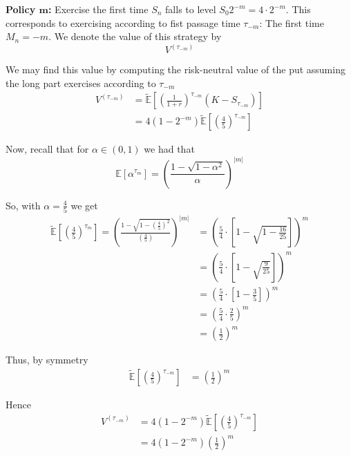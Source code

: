 \documentclass[12pt]{article}
\newlength\tindent
\renewcommand{\indent}{\hspace*{\tindent}}
\newcommand{\E}{\mathbb E}
\begin{document}
\begin{adjustwidth}{1cm}{} {\bf Policy $\bm m$:} Exercise the first time $S_n$ falls to level $S_0 2^{-m} = 4\cdot 2^{-m}$. This corresponds to exercising according to fist passage time $\tau_{-m}$: The first time $M_n = -m$. We denote the value of this strategy by
\begin{equation*}
	V^{(\tau_{-m})}
\end{equation*}

\indent We may find this value by computing the risk-neutral value of the put assuming the long part exercises according to $\tau_{-m}$
\begin{align*}
	V^{(\tau_{-m})} &= \tilde{\E} \left[ \left( \frac{1}{1 + r} \right)^{\tau_{-m}} (K - S_{\tau_{-m}}) \right] \\
	&= 4 \left( 1 - 2^{-m} \right) \tilde{\E} \left[ \left( \frac{4}{5} \right)^{\tau_{-m}} \right]
\end{align*}

Now, recall that for $\alpha \in (0,1)$ we had that
\begin{equation*}
	\E \left[ \alpha^{\tau_m} \right] = \left( \frac{1 - \sqrt{1 - \alpha^2}}{ \alpha} \right)^{|m|}
\end{equation*}

So, with $\alpha = \frac{4}{5}$ we get
\begin{align*}
	\tilde{\E} \left[ \left( \frac{4}{5} \right)^{\tau_m} \right] = \left( \frac{1 - \sqrt{1 - \left( \frac{4}{5}\right)^2}}{ \left( \frac{4}{5} \right) } \right)^{|m|} &= \left( \frac{5}{4} \cdot \left[ 1 - \sqrt{ 1 - \frac{16}{25} }\right]  \right)^{m} \\
	&= \left( \frac{5}{4} \cdot \left[ 1 - \sqrt{ \frac{9}{25} } \right] \right)^m \\
	&= \left( \frac{5}{4}\cdot\left[ 1 - \frac{3}{5}\right] \right)^m \\
	&= \left( \frac{5}{4}\cdot\frac{2}{5} \right)^m \\
	&= \left( \frac{1}{2} \right)^m
\end{align*}

Thus, by symmetry
\begin{align*}
	\tilde{\E} \left[ \left( \frac{4}{5} \right)^{\tau_{-m}} \right] &= \left( \frac{1}{2} \right)^m
\end{align*}

Hence
\begin{align*}
	V^{(\tau_{-m})} &= 4 \left( 1 - 2^{-m} \right) \tilde{\E} \left[ \left( \frac{4}{5} \right)^{\tau_{-m}} \right] \\
	&= 4 \left( 1 - 2^{-m} \right)  \left( \frac{1}{2} \right)^m \\
\end{align*}
\end{adjustwidth}
\end{document}
